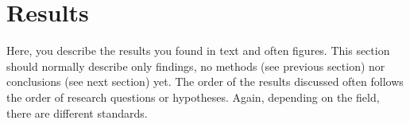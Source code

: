 \chapter{Results}\label{results}
Here, you describe the results you found in text and often figures. This section should normally describe only findings, no methods (see previous section) nor conclusions (see next section) yet. The order of the results discussed often follows the order of research questions or hypotheses. Again, depending on the field, there are different standards. 

